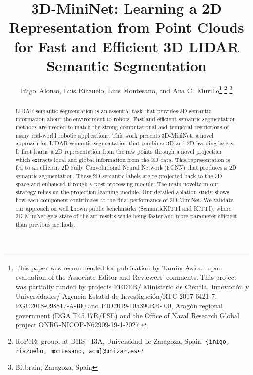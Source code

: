 \documentclass[letterpaper, 10 pt, journal, twoside]{IEEEtran}
\begin{document}
\title{
3D-MiniNet: Learning a 2D Representation from Point Clouds  for Fast and Efficient 3D LIDAR Semantic Segmentation}



\author{I\~{n}igo~Alonso, Luis Riazuelo,  Luis Montesano, and  Ana C.~Murillo\thanks{This paper was recommended for publication by Tamim Asfour upon
evaluation of the Associate Editor and Reviewers' comments. 
This project was partially funded by projects FEDER/ Ministerio de Ciencia, Innovaci{\'o}n y Universidades/ Agencia Estatal de Investigaci{\'o}n/RTC-2017-6421-7, PGC2018-098817-A-I00 and PID2019-105390RB-I00, Arag{\'o}n regional government (DGA T45 17R/FSE) and the Office of Naval Research Global project ONRG-NICOP-N62909-19-1-2027.}
\thanks{ RoPeRt group, at DIIS - I3A, Universidad de Zaragoza, Spain. {\tt\small  \{inigo, riazuelo, montesano, acm\}@unizar.es}}
\thanks{ Bitbrain, Zaragoza, Spain} 
}


 


\maketitle

\begin{abstract}

LIDAR semantic segmentation is an essential task that provides 3D semantic information about the  environment to robots.
Fast and efficient semantic segmentation methods  are needed to match the strong computational and temporal restrictions of many real-world robotic  applications. 
This work presents 3D-MiniNet, a novel approach for LIDAR semantic segmentation that combines 3D and 2D learning layers. 
It first learns a 2D representation from the raw points through a novel projection which extracts local and global information from the 3D data. 
This representation is fed to an efficient 2D Fully Convolutional Neural Network (FCNN) that produces a 2D semantic segmentation. These 2D semantic labels are re-projected back to the 3D space and enhanced through a post-processing module. 
The main novelty in our strategy relies on the projection learning module. Our detailed ablation study shows how each component contributes to the final performance of 3D-MiniNet. 
We validate our approach on well known public benchmarks (SemanticKITTI and KITTI), where 3D-MiniNet gets state-of-the-art results while being faster and more parameter-efficient than previous methods. 
\end{abstract}
\end{document}
